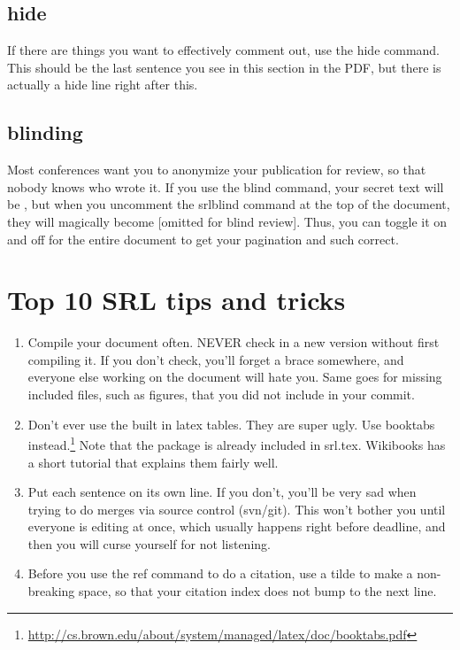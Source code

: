 \documentclass{sigchi}
\begin{document}
\subsection{hide}
If there are things you want to effectively comment out, use the hide command.
This should be the last sentence you see in this section in the PDF, but there is actually a hide line right after this.

\subsection{blinding}
Most conferences want you to anonymize your publication for review, so that nobody knows who wrote it.
If you use the blind command, your secret text will be , but when you uncomment the srlblind command at the top of the document, they will magically become [omitted for blind review].
Thus, you can toggle it on and off for the entire document to get your pagination and such correct.

\section{Top 10 SRL tips and tricks}

\begin{enumerate}

\item
Compile your document often.
NEVER check in a new version without first compiling it.
If you don't check, you'll forget a brace somewhere, and everyone else working on the document will hate you.
Same goes for missing included files, such as figures, that you did not include in your commit.

\item
Don't ever use the built in latex tables.
They are super ugly.
Use booktabs instead.\footnote{\url{http://cs.brown.edu/about/system/managed/latex/doc/booktabs.pdf}}
Note that the package is already included in srl.tex.
Wikibooks has a short tutorial that explains them fairly well.
\item
Put each sentence on its own line.
If you don't, you'll be very sad when trying to do merges via source control (svn/git).
This won't bother you until everyone is editing at once, which usually happens right before deadline, and then you will curse yourself for not listening.

\item
Before you use the ref command to do a citation, use a tilde to make a non-breaking space, so that your citation index does not bump to the next line.

\end{enumerate}
\end{document}
